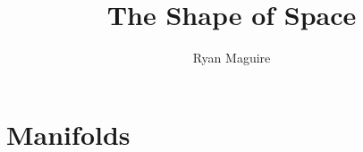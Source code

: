 \documentclass{article}                                                        %
\begin{document}
    \title{The Shape of Space} 
    \author{Ryan Maguire}
    \date{\vspace{-5ex}}
    \maketitle
    \section{Manifolds}
\end{document}
